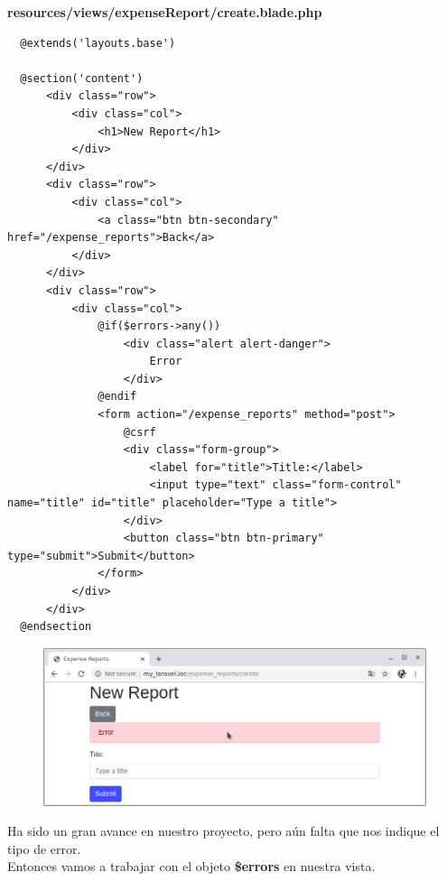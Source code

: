 \documentclass{article}
\begin{document}
\textbf{resources/views/expenseReport/create.blade.php}
\begin{verbatim}
  @extends('layouts.base')

  @section('content')
      <div class="row">
          <div class="col">
              <h1>New Report</h1>
          </div>
      </div>
      <div class="row">
          <div class="col">
              <a class="btn btn-secondary" href="/expense_reports">Back</a>
          </div>
      </div>
      <div class="row">
          <div class="col">
              @if($errors->any())
                  <div class="alert alert-danger">
                      Error
                  </div>
              @endif
              <form action="/expense_reports" method="post">
                  @csrf
                  <div class="form-group">
                      <label for="title">Title:</label>
                      <input type="text" class="form-control" name="title" id="title" placeholder="Type a title">
                  </div>
                  <button class="btn btn-primary" type="submit">Submit</button>
              </form>
          </div>
      </div>
  @endsection
\end{verbatim}

\begin{figure}[h!]
  \centering
  \includegraphics[scale=0.5]{./Pictures/089_validate_div_error.png}
\end{figure}

Ha sido un gran avance en nuestro proyecto, pero aún falta que nos indique el
tipo de error.\\

Entonces vamos a trabajar con el objeto \textbf{\$errors} en nuestra vista.\\
\end{document}
